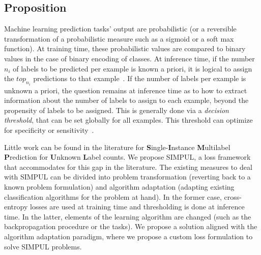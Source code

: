 \subsection{Proposition}

Machine learning prediction tasks' output are probabilistic (or a reversible transformation of a probabilistic measure such as a sigmoid or a soft max function). At training time, these probabilistic values are compared to binary values in the case of binary encoding of classes. At inference time, if the number $n_i$ of labels to be predicted per example is known a priori, it is logical to assign the $top_{n_i}$ predictions to that example~\cite{lossTopKError, topKmulticlassSVM}. If the number of labels per example is unknown a priori, the question remains at inference time as to how to extract information about the number of labels to assign to each example, beyond the propensity of labels to be assigned. This is generally done via a \emph{decision threshold}, that can be set globally for all examples. This threshold can optimize for specificity or sensitivity~\cite{decisionThreshold}.


Little work can be found in the literature for \textbf{S}ingle-\textbf{I}nstance \textbf{M}ultilabel \textbf{P}rediction for \textbf{U}nknown \textbf{L}abel counts. We propose SIMPUL, a loss framework that accommodates for this gap in the literature. The existing measures to deal with SIMPUL can be divided into problem transformation (reverting back to a known problem formulation) and algorithm adaptation (adapting existing classification algorithms for the problem at hand). In the former case, cross-entropy losses are used at training time and thresholding is done at inference time. In the latter, elements of the learning algorithm are changed (such as the backpropagation procedure or the tasks). We propose a solution aligned with the algorithm adaptation paradigm, where we propose a custom loss formulation to solve SIMPUL problems.






